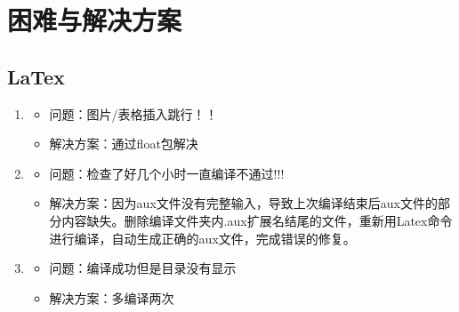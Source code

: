 \documentclass[UTF8]{ctexart}
\begin{document}
  \section{困难与解决方案}
  \subsection{LaTex}








\begin{enumerate}
\item
\begin{itemize}
\item 问题：图片/表格插入跳行！！
\item 解决方案：通过float包解决
\end{itemize}
\item
\begin{itemize}
\item 问题：检查了好几个小时一直编译不通过!!!
\item 解决方案：因为aux文件没有完整输入，导致上次编译结束后aux文件的部分内容缺失。删除编译文件夹内.aux扩展名结尾的文件，重新用Latex命令进行编译，自动生成正确的aux文件，完成错误的修复。
\end{itemize}
\item
\begin{itemize}
\item 问题：编译成功但是目录没有显示
\item 解决方案：多编译两次
 \end{itemize}
\end{enumerate}
\end{document}
